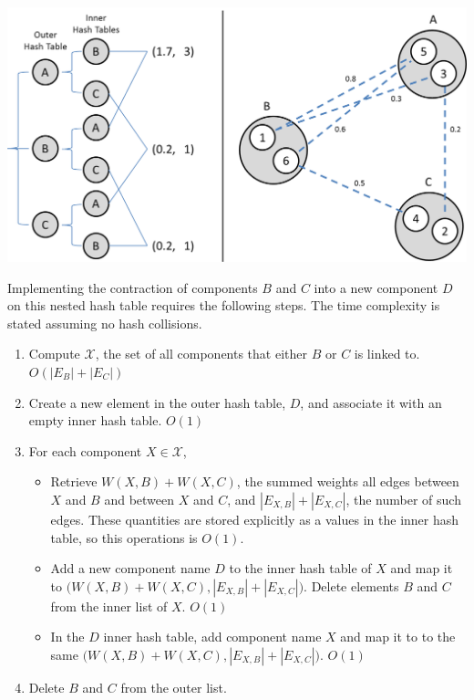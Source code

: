 \includegraphics[scale = 0.6]{figs/4_cg_implement}

Implementing the contraction of components $B$ and $C$ into a new
component $D$ on this nested hash table requires the following steps.
The time complexity is stated assuming no hash collisions.

\begin{enumerate}
\item
Compute $\mathcal{X}$, the set of all components that either $B$ or $C$
is linked to. $O(|E_B| + |E_C|)$

\item
Create a new element in the outer hash table, $D$, and associate it
with an empty inner hash table. $O(1)$

\item
For each component $X \in \mathcal{X}$,
\begin{itemize}
\item
Retrieve $W(X,B) + W(X,C)$, the summed weights all edges between $X$
and $B$ and between $X$ and $C$, and $|E_{X,B}| + |E_{X,C}|$, the
number of such edges. These quantities are stored explicitly as a
values in the inner hash table, so this operations is $O(1)$.

\item
Add a new component name $D$ to the inner hash table of $X$ and map it
to $\big( W(X,B) + W(X,C), |E_{X,B}| + |E_{X,C}| \big)$. Delete
elements $B$ and $C$ from the inner list of $X$. $O(1)$

\item
In the $D$ inner hash table, add component name $X$ and map it to
to the same $\big( W(X,B) + W(X,C), |E_{X,B}| + |E_{X,C}| \big)$.
$O(1)$
\end{itemize}

\item
Delete $B$ and $C$ from the outer list.
\end{enumerate}

